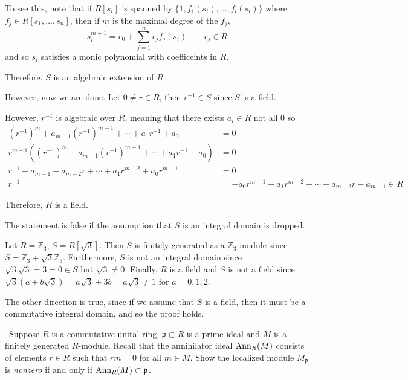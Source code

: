 \documentclass[12pt]{AlgebraQual}
\begin{document}
\begin{solution}
To see this, note that if $R[s_i]$ is spanned by $\{1,f_1(s_i),...,f_l(s_i)\}$ where $f_j\in R[s_1,...,s_n]$, then if $m$ is the maximal degree of the $f_j$, $$s_i^{m+1}=r_0+\sum_{j=1}^nr_jf_j(s_i)\qquad r_j\in R$$ and so $s_i$ satisfies a monic polynomial with coefficeints in $R$.

Therefore, $S$ is an algebraic extension of $R$.

However, now we are done. Let $0\not=r\in R$, then $r^{-1}\in S$ since $S$ is a field.

However, $r^{-1}$ is algebraic over $R$, meaning that there exists $a_i\in R$ not all $0$ so \begin{align*}
    (r^{-1})^m+a_{m-1}(r^{-1})^{m-1}+\cdots+a_1r^{-1}+a_0&=0\\
     r^{m-1}((r^{-1})^m+a_{m-1}(r^{-1})^{m-1}+\cdots+a_1r^{-1}+a_0)&=0\\
     r^{-1}+a_{m-1}+a_{m-2}r+\cdots+a_1r^{m-2}+a_0r^{m-1}&=0\\
     r^{-1}&=-a_0r^{m-1}-a_1r^{m-2}-\cdots-a_{m-2}r-a_{m-1}\in R
\end{align*}

Therefore, $R$ is a field.

\begin{mybox}
The statement is false if the assumption that $S$ is an integral domain is dropped.

\boxed{\centernot\implies} Let $R=\mathbb{Z}_3$, $S=R[\sqrt{3}]$. Then $S$ is finitely generated as a $\mathbb{Z}_3$ module since $S=\mathbb{Z}_3+\sqrt{3}\mathbb{Z}_3$. Furthermore, $S$ is not an integral domain since $\sqrt{3}\sqrt{3}=3=0\in S$ but $\sqrt{3}\not=0$. Finally, $R$ is a field and $S$ is not a field since $\sqrt{3}(a+b\sqrt{3})=a\sqrt{3}+3b=a\sqrt{3}\not=1$ for $a=0,1,2$.

\boxed{\impliedby} The other direction is true, since if we assume that $S$ is a field, then it must be a commutative integral domain, and so the proof holds.
\end{mybox}

\end{solution}
\newpage


\begin{problem} $\,$
Suppose $R$ is a commutative unital ring, $\mathfrak{p}\subset R$ is a prime ideal and $M$ is a finitely generated $R$-module. Recall that the annihilator ideal $\text{Ann}_R(M)$ consists of elements $r\in R$ such that $rm=0$ for all $m\in M$. Show the localized module $M_\mathfrak{p}$ is \textit{nonzero} if and only if $\text{Ann}_R(M)\subset\mathfrak{p}$.
\end{problem}
\end{document}
